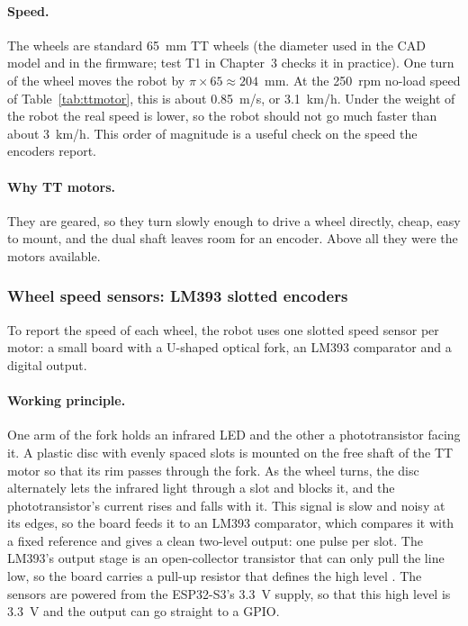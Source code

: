 \paragraph{Speed.} The wheels are standard 65~mm TT wheels (the diameter used in the
CAD model and in the firmware; test T1 in Chapter~3 checks it in practice). One turn of
the wheel moves the robot by \(\pi \times 65 \approx 204\)~mm. At the 250~rpm no-load
speed of Table~\ref{tab:ttmotor}, this is about 0.85~m/s, or 3.1~km/h. Under the weight
of the robot the real speed is lower, so the robot should not go much faster than about
3~km/h. This order of magnitude is a useful check on the speed the encoders report.

\paragraph{Why TT motors.} They are geared, so they turn slowly enough to drive a wheel
directly, cheap, easy to mount, and the dual shaft leaves room for an encoder. Above
all they were the motors available.

\subsubsection{Wheel speed sensors: LM393 slotted encoders}
\label{sec:encoders}
To report the speed of each wheel, the robot uses one slotted speed sensor per motor:
a small board with a U-shaped optical fork, an LM393 comparator and a digital output.

\paragraph{Working principle.} One arm of the fork holds an infrared LED and the other a
phototransistor facing it. A plastic disc with evenly spaced slots is mounted on the
free shaft of the TT motor so that its rim passes through the fork. As the wheel turns,
the disc alternately lets the infrared light through a slot and blocks it, and the
phototransistor's current rises and falls with it. This signal is slow and noisy at its
edges, so the board feeds it to an LM393 comparator, which compares it with a fixed
reference and gives a clean two-level output: one pulse per slot. The LM393's output
stage is an open-collector transistor that can only pull the line low, so the board
carries a pull-up resistor that defines the high level \cite{lm393_datasheet}. The
sensors are powered from the ESP32-S3's 3.3~V supply, so that this high level is 3.3~V and the
output can go straight to a GPIO.

